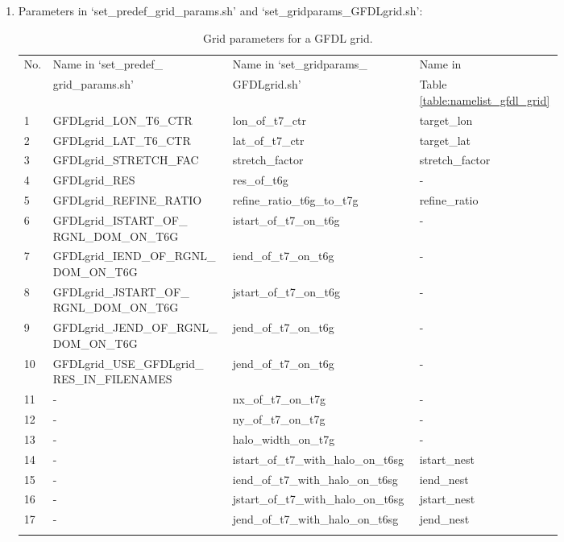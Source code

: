 \documentclass[11pt,fleqn]{report}              %
\begin{document}
\begin{enumerate}
\item Parameters in `set\_predef\_grid\_params.sh' and `set\_gridparams\_GFDLgrid.sh':

{
\fontsize{10}{12}\selectfont
\begin{longtable}{p{0.03\linewidth} | p{0.31\linewidth} | p{0.31\linewidth} | p{0.15\linewidth} }
\hline
\hline
\multirow{2}{*}{No.} & Name in `set\_predef\_  & Name in `set\_gridparams\_  & Name in   \\
 & grid\_params.sh' & GFDLgrid.sh'   & Table \ref{table:namelist_gfdl_grid}\\
\hline
1 & GFDLgrid\_LON\_T6\_CTR & lon\_of\_t7\_ctr  & target\_lon  \\
2 & GFDLgrid\_LAT\_T6\_CTR & lat\_of\_t7\_ctr & target\_lat \\
3 & GFDLgrid\_STRETCH\_FAC & stretch\_factor & stretch\_factor \\
4 & GFDLgrid\_RES & res\_of\_t6g & - \\
5 & GFDLgrid\_REFINE\_RATIO & refine\_ratio\_t6g\_to\_t7g & refine\_ratio \\
6 & GFDLgrid\_ISTART\_OF\_ RGNL\_DOM\_ON\_T6G & istart\_of\_t7\_on\_t6g & - \\
7 & GFDLgrid\_IEND\_OF\_RGNL\_ DOM\_ON\_T6G & iend\_of\_t7\_on\_t6g & - \\
8 & GFDLgrid\_JSTART\_OF\_ RGNL\_DOM\_ON\_T6G & jstart\_of\_t7\_on\_t6g & - \\
9 & GFDLgrid\_JEND\_OF\_RGNL\_ DOM\_ON\_T6G & jend\_of\_t7\_on\_t6g & - \\
10 & GFDLgrid\_USE\_GFDLgrid\_ RES\_IN\_FILENAMES & jend\_of\_t7\_on\_t6g & - \\
11 & - & nx\_of\_t7\_on\_t7g & - \\
12 & - & ny\_of\_t7\_on\_t7g & - \\
13 & - & halo\_width\_on\_t7g & - \\
14 & - & istart\_of\_t7\_with\_halo\_on\_t6sg & istart\_nest \\
15 & - & iend\_of\_t7\_with\_halo\_on\_t6sg & iend\_nest \\
16 & - & jstart\_of\_t7\_with\_halo\_on\_t6sg & jstart\_nest \\
17 & - & jend\_of\_t7\_with\_halo\_on\_t6sg & jend\_nest \\
\hline
\caption{Grid parameters for a GFDL grid.}
\label{table:gridparams_gfdl}
\end{longtable}
}


\end{enumerate}
\end{document}
